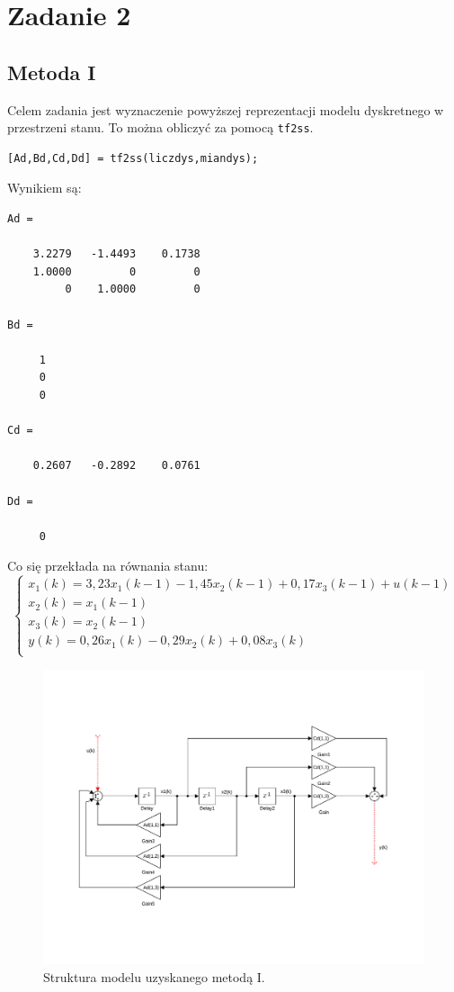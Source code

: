 \section{Zadanie 2}
\subsection{Metoda I}
Celem zadania jest wyznaczenie powyższej reprezentacji modelu dyskretnego w przestrzeni stanu. To można obliczyć za pomocą \texttt{tf2ss}.
\begin{verbatim}
[Ad,Bd,Cd,Dd] = tf2ss(liczdys,miandys);
\end{verbatim}
Wynikiem są:
\begin{verbatim}
Ad =

    3.2279   -1.4493    0.1738
    1.0000         0         0
         0    1.0000         0
         
Bd =

     1
     0
     0

Cd =

    0.2607   -0.2892    0.0761
    
Dd =

     0
\end{verbatim}
Co się przekłada na równania stanu:
\[
\left\{
\begin{array}{l}
	x_1(k)= 3,23x_1(k-1) -1,45x_2(k-1) +0,17x_3(k-1) + u(k-1) \\
	x_2(k)= x_1(k-1) \\
	x_3(k)= x_2(k-1) \\
	y(k)= 0,26x_1(k) -0,29x_2(k) + 0,08x_3(k) \\ 
\end{array}
\right.
\]
\begin{figure}[H]
\centering
 \includegraphics[width=\textwidth]{img/stp2_1.pdf}
\caption{Struktura modelu uzyskanego metodą I.}
\end{figure} 

